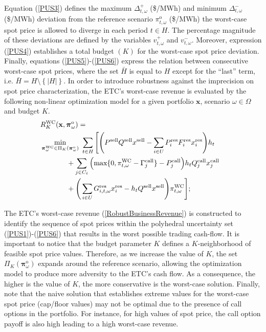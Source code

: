 	Equation (\ref{PUS3}) defines the maximum $\Delta_{t, \omega}^{+}$ (\$/MWh) and minimum $\Delta_{t, \omega}^{-}$ (\$/MWh) deviation from the reference scenario $\pi^{\text{o}}_{t, \omega}$ (\$/MWh) the worst-case spot price is allowed to diverge in each period $t \in H$. The percentage magnitude of these deviations are defined by the variables $v_{t,\omega}^{+}$ and $v_{t,\omega}^{-}$. Moreover, expression (\ref{PUS4}) establishes a total budget $(K)$ for the worst-case spot price deviation. Finally, equations (\ref{PUS5})-(\ref{PUS6}) express the relation between consecutive worst-case spot prices, where the set $\bar{H}$ is equal to $H$ except for the ``last'' term, i.e. $\bar{H} = H\setminus\left\{|H|\right\}$. In order to introduce robustness against the imprecision on spot price characterization, the ETC's worst-case revenue is evaluated by the following non-linear optimization model for a given portfolio $\mathbf{x}$, scenario $\omega \in \Omega$ and budget $K$.
%
\begin{align}
	& \hspace{-0.30cm} R_{K}^{\text{WC}}(\mathbf{x}, \boldsymbol{\pi}_{\omega}^{\text{o}}) = \notag \\
			& \hspace{-0.30cm} \min_{\boldsymbol{\pi}_{\omega}^{\text{WC}} \in \Pi_{K}(\boldsymbol{\pi}_{\omega}^{\text{o}})} ~ \sum_{t \in H} \Bigg[ \Bigg(P^{\text{sell}} Q^{\text{sell}} x^{\text{sell}} - \sum_{i \in U} P_{i}^{\text{res}} F_{i}^{\text{res}} x_{i}^{\text{res}}\Bigg) h_{t} \notag \\
	 		& \hspace{1.00cm} + \sum_{j \in C_{t}} \Big( \text{max}\{0, \pi^{\text{WC}}_{t,\omega} - \Gamma_{j}^{\text{call}}\} - P_{j}^{\text{call}} \Big) h_{t} Q_{j}^{\text{call}} x_{j}^{\text{call}} \notag \\
			& \hspace{1.00cm} + \Bigg( \sum_{i \in U} G_{i,t,\omega}^{\text{res}} x_{i}^{\text{res}} - h_{t} Q^{\text{sell}} x^{\text{sell}} \Bigg)\pi^{\text{WC}}_{t,\omega} \Bigg]; \label{RobustBusinessRevenue}
\end{align}

	The ETC's worst-case revenue (\ref{RobustBusinessRevenue}) is constructed to identify the sequence of spot prices within the polyhedral uncertainty set (\ref{PUS1})-(\ref{PUS6}) that results in the worst possible trading cash-flow. It is important to notice that the budget parameter $K$ defines a $K$-neighborhood of feasible spot price values. Therefore, as we increase the value of $K$, the set $\Pi_{K}(\boldsymbol{\pi}_{\omega}^{\text{o}})$ expands around the reference scenario, allowing the optimization model to produce more adversity to the ETC's cash flow. As a consequence, the higher is the value of $K$, the more conservative is the worst-case solution. Finally, note that the naive solution that establishes extreme values for the worst-case spot price (cap/floor values) may not be optimal due to the presence of call options in the portfolio. For instance, for high values of spot price, the call option payoff is also high leading to a high worst-case revenue.

